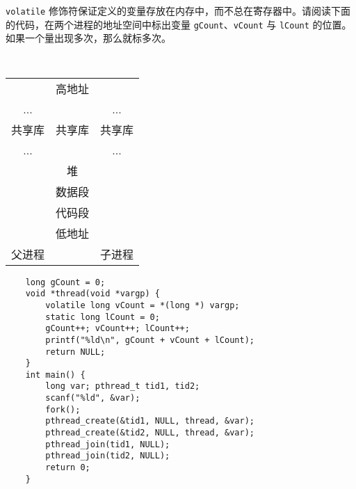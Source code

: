     \begin{problems}
        \pro \verb|volatile| 修饰符保证定义的变量存放在内存中，而不总在寄存器中。请阅读下面的代码，在两个进程的地址空间中标出变量 \verb|gCount|、\verb|vCount| 与 \verb|lCount| 的位置。如果一个量出现多次，那么就标多次。
        \begin{table}[H]
            \tt
            \centering
            \begin{tabular}{ccc}
                \cline{1-1} \cline{3-3}
                \multicolumn{1}{|c|}{} & \multicolumn{1}{c|}{高地址} & \multicolumn{1}{c|}{} \\ \cline{1-1} \cline{3-3} 
                \multicolumn{1}{|c|}{...} & \multicolumn{1}{c|}{} & \multicolumn{1}{c|}{...} \\ \cline{1-1} \cline{3-3} 
                \multicolumn{1}{|c|}{共享库} & \multicolumn{1}{c|}{共享库} & \multicolumn{1}{c|}{共享库} \\ \cline{1-1} \cline{3-3} 
                \multicolumn{1}{|c|}{...} & \multicolumn{1}{c|}{} & \multicolumn{1}{c|}{...} \\ \cline{1-1} \cline{3-3} 
                \multicolumn{1}{|c|}{} & \multicolumn{1}{c|}{堆} & \multicolumn{1}{c|}{} \\ \cline{1-1} \cline{3-3} 
                \multicolumn{1}{|c|}{} & \multicolumn{1}{c|}{数据段} & \multicolumn{1}{c|}{} \\ \cline{1-1} \cline{3-3} 
                \multicolumn{1}{|c|}{} & \multicolumn{1}{c|}{代码段} & \multicolumn{1}{c|}{} \\ \cline{1-1} \cline{3-3} 
                \multicolumn{1}{|c|}{} & \multicolumn{1}{c|}{低地址} & \multicolumn{1}{c|}{} \\ \cline{1-1} \cline{3-3} 
                父进程 &  & 子进程
            \end{tabular}
        \end{table}
        \begin{verbatim}
    long gCount = 0;
    void *thread(void *vargp) {
        volatile long vCount = *(long *) vargp;
        static long lCount = 0;
        gCount++; vCount++; lCount++;
        printf("%ld\n", gCount + vCount + lCount);
        return NULL;
    }
    int main() {
        long var; pthread_t tid1, tid2;
        scanf("%ld", &var);
        fork();
        pthread_create(&tid1, NULL, thread, &var);
        pthread_create(&tid2, NULL, thread, &var);
        pthread_join(tid1, NULL);
        pthread_join(tid2, NULL);
        return 0;
    }

\end{verbatim}
\end{problems}
